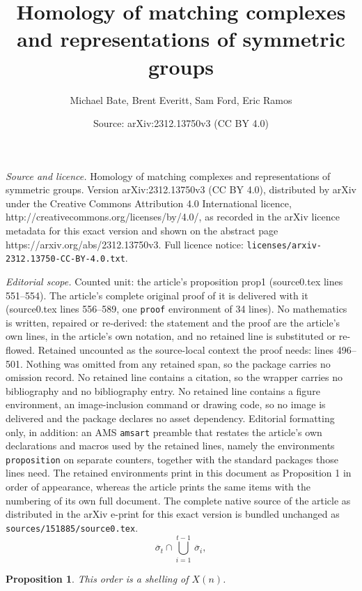 \documentclass[10pt,a4paper]{amsart}
\title{Homology of matching complexes and representations of symmetric groups}
\author{Michael Bate, Brent Everitt, Sam Ford, Eric Ramos}
\date{Source: arXiv:2312.13750v3 (CC BY 4.0)}
\newtheorem{proposition}{Proposition}
\begin{document}
\maketitle

\noindent\emph{Source and licence.} Homology of matching complexes and representations of symmetric groups. Version arXiv:2312.13750v3 (CC BY 4.0), distributed by arXiv under the Creative Commons Attribution 4.0 International licence, http://creativecommons.org/licenses/by/4.0/, as recorded in the arXiv licence metadata for this exact version and shown on the abstract page https://arxiv.org/abs/2312.13750v3. Full licence notice: \texttt{licenses/arxiv-2312.13750-CC-BY-4.0.txt}.\par\smallskip

\noindent\textit{Editorial scope.} Counted unit: the article's proposition prop1 (source0.tex lines 551--554). The article's complete original proof of it is delivered with it (source0.tex lines 556--589, one \texttt{proof} environment of 34 lines). No mathematics is written, repaired or re-derived: the statement and the proof are the article's own lines, in the article's own notation, and no retained line is substituted or re-flowed.  Retained uncounted as the source-local context the proof needs: lines 496--501.  Nothing was omitted from any retained span, so the package carries no omission record.  No retained line contains a citation, so the wrapper carries no bibliography and no bibliography entry.  No retained line contains a figure environment, an image-inclusion command or drawing code, so no image is delivered and the package declares no asset dependency.  Editorial formatting only, in addition: an AMS \texttt{amsart} preamble that restates the article's own declarations and macros used by the retained lines, namely the environments \texttt{proposition} on separate counters, together with the standard packages those lines need.  The retained environments print in this document as Proposition 1 in order of appearance, whereas the article prints the same items with the numbering of its own full document.  The complete native source of the article as distributed in the arXiv e-print for this exact version is bundled unchanged as \texttt{sources/151885/source0.tex}.
\begin{equation}
\label{eq5}
    \overline{\sigma}_t
\cap
{\textstyle \bigcup}_{i=1}^{t-1}\,\overline{\sigma}_i,
\end{equation}

\begin{proposition}
  \label{prop1}
This order is a shelling of $X(n)$.
\end{proposition}
\end{document}
